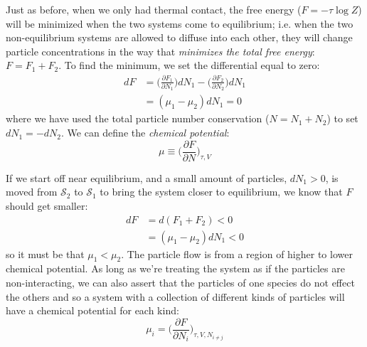 Just as before, when we only had thermal contact, the 
free energy ($F = -\tau \log{Z}$) will be minimized when the two
systems come to equilibrium; i.e. when the two non-equilibrium
systems are allowed to diffuse into each other, they will change
particle concentrations in the way that \textit{minimizes the total
free energy}: $F = F_1 + F_2$. To find the minimum, we set the differential equal to zero:
\begin{align}
dF &= \bigg(\frac{\partial F_1}{\partial N_1}\bigg) dN_1
	- \bigg(\frac{\partial F_2}{\partial N_2}\bigg) dN_1 \\
   &= (\mu_1 - \mu_2) dN_1 = 0
\label{eq:ChemEquil}
\end{align}
where we have used the total particle number conservation ($N = N_1 + N_2$)
to set $dN_1 = -dN_2$. We can define the \textit{chemical potential}:
\begin{equation}
\boxed{\mu \equiv \bigg(\frac{\partial F}{\partial N}\bigg)_{\tau,V}}
\label{eq:ChemPot}
\end{equation}

If we start off near equilibrium, and a small amount of particles, 
$dN_1 > 0$, is moved from $\mathcal{S}_2$ to $\mathcal{S}_1$ to
bring the system closer to equilibrium, we know that $F$ should get smaller:
\begin{align}
dF &= d(F_1 + F_2) < 0 \\
   &= (\mu_1 - \mu_2) dN_1 < 0
\end{align}
so it must be that $\mu_1 < \mu_2$. The particle flow is from a region of
higher to lower chemical potential. As long as we're treating the system as if the particles are non-interacting, we can also assert that the particles of one species do not effect the others and so a system with a collection of different kinds of particles will have a chemical potential for each kind:
\begin{equation}
\mu_i = \bigg(\frac{\partial F}{\partial N_i}\bigg)_{\tau,V,N_{i \neq j}}
\end{equation}


